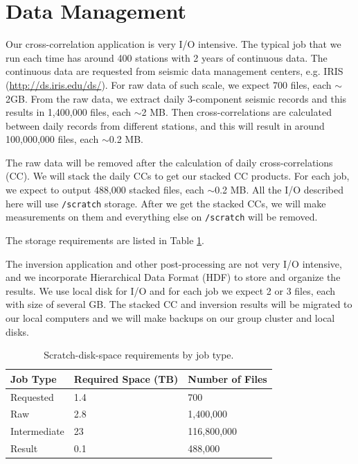 \documentclass[10pt, letterpaper]{article}
\begin{document}
\section{Data Management}\label{sec:IO}
Our cross-correlation application is very I/O intensive. The typical job that we run each time has around 400 stations with 2 years of continuous data. The continuous data are requested from seismic data management centers, e.g. IRIS (\url{http://ds.iris.edu/ds/}). For raw data of such scale, we expect 700 files, each $\sim$2GB. From the raw data, we extract daily 3-component seismic records and this results in 1,400,000 files, each $\sim$2 MB.
Then cross-correlations are calculated between daily records from different stations, and this will result in around 100,000,000 files, each $\sim$0.2 MB.

The raw data will be removed after the calculation of daily cross-correlations (CC). We will stack the daily CCs to get our stacked CC products. For each job, we expect to output 488,000 stacked files, each $\sim$0.2 MB. All the I/O described here will use \lstinline{/scratch} storage. After we get the stacked CCs, we will make measurements on them and everything else on \lstinline{/scratch} will be removed.

The storage requirements are listed in Table \ref{tab:space}.

The inversion application and other post-processing are not very I/O intensive, and we incorporate Hierarchical Data Format (HDF) to store and organize the results. We use local disk for I/O and for each job we expect 2 or 3 files, each with size of several GB. The stacked CC and inversion results will be migrated to our local computers and we will make backups on our group cluster and local disks.

\begin{table}[h]
\centering
\begin{tabular}{| l | l | l |}
\hline
  Job Type            & Required Space (TB) & Number of Files  \\ \hline
  Requested           & 1.4                 & 700   \\
  Raw                 & 2.8                 & 1,400,000   \\
  Intermediate        & 23                  & 116,800,000 \\
  Result              & 0.1                 & 488,000 \\
\hline
\end{tabular}
\caption{\label{tab:space}Scratch-disk-space requirements by job type.}
\end{table}

\end{document}

